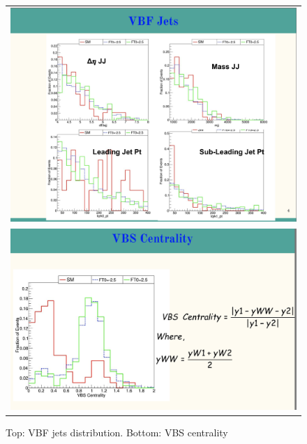 \begin{figure}[htb]
  \begin{center}
    \begin{tabular}{c}
    \includegraphics[width=1.00\textwidth]{Plots/GenLevelStudy/pic3.png}\\
    \includegraphics[width=1.00\textwidth]{Plots/GenLevelStudy/pic4.png}    \end{tabular}
    \caption{Top: VBF jets distribution. Bottom: VBS centrality}
    \label{fig:gen2}
  \end{center}
\end{figure}
